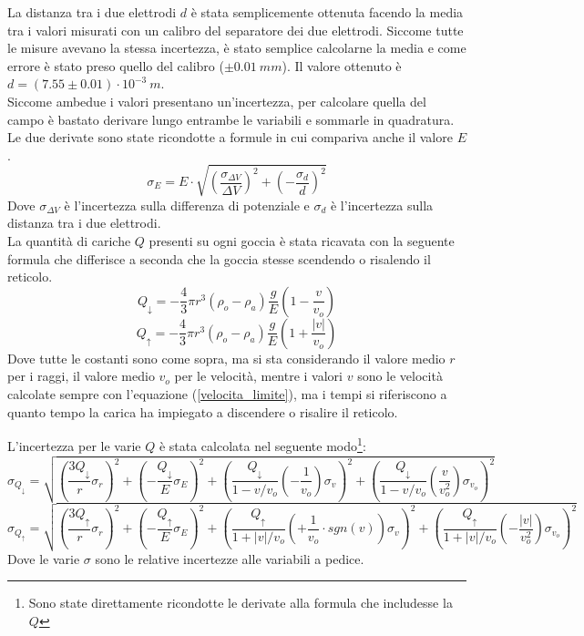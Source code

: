 \documentclass{article}
\begin{document}
La distanza tra i due elettrodi $d$ è stata semplicemente ottenuta facendo la media tra i valori misurati con un calibro del separatore dei due elettrodi. Siccome tutte le misure avevano la stessa incertezza, è stato semplice calcolarne la media e come errore è stato preso quello del calibro ($\pm 0.01\ mm$). Il valore ottenuto è $d = (7.55 \pm 0.01)\cdot10^{-3}\ m$.\\

Siccome ambedue i valori presentano un'incertezza, per calcolare quella del campo è bastato derivare lungo entrambe le variabili e sommarle in quadratura. Le due derivate sono state ricondotte a formule in cui compariva anche il valore $E$.
\begin{equation}
	\sigma_{E}=E\cdot\sqrt{\left(\frac{\sigma_{\Delta V}}{\Delta V}\right)^2+\left(-\frac{\sigma_d}{d}\right)^2}
\end{equation}
Dove $\sigma_{\Delta V}$ è l'incertezza sulla differenza di potenziale e $\sigma_d$ è l'incertezza sulla distanza tra i due elettrodi.\\

La quantità di cariche $Q$ presenti su ogni goccia è stata ricavata con la seguente formula che differisce a seconda che la goccia stesse scendendo o risalendo il reticolo.
\begin{equation}
	Q_{\downarrow}=-\frac{4}{3}\pi r^3(\rho_o-\rho_a)\frac{g}{E}\left(1-\frac{v}{v_o}\right)
	\label{qsu}
\end{equation}
\begin{equation}
	Q_{\uparrow}=-\frac{4}{3}\pi r^3(\rho_o-\rho_a)\frac{g}{E}\left(1+\frac{|v|}{v_o}\right)
	\label{qgiu}
\end{equation}
Dove tutte le costanti sono come sopra, ma si sta considerando il valore medio $r$ per i raggi, il valore medio $v_o$ per le velocità, mentre i valori $v$ sono le velocità calcolate sempre con l'equazione (\ref{velocita_limite}), ma i tempi si riferiscono a quanto tempo la carica ha impiegato a discendere o risalire il reticolo.

L'incertezza per le varie $Q$ è stata calcolata nel seguente modo\footnote{Sono state direttamente ricondotte le derivate alla formula che includesse la $Q$}:
\begin{equation}
	\sigma_{Q_{\downarrow}}=\sqrt{\left(\frac{3Q_{\downarrow}}{r}\sigma_r\right)^2+\left(-\frac{Q_{\downarrow}}{E}\sigma_E\right)^2+\left(\frac{Q_{\downarrow}}{1-v/v_o}\left(-\frac{1}{v_o}\right)\sigma_v\right)^2+\left(\frac{Q_{\downarrow}}{1-v/v_o}\left(\frac{v}{v_o^2}\right)\sigma_{v_o}\right)^2}
\end{equation}
\begin{equation}
	\sigma_{Q_{\uparrow}}=\sqrt{\left(\frac{3Q_{\uparrow}}{r}\sigma_r\right)^2+\left(-\frac{Q_{\uparrow}}{E}\sigma_E\right)^2+\left(\frac{Q_{\uparrow}}{1+|v|/v_o}\left(+\frac{1}{v_o}\cdot sgn(v)\right)\sigma_v\right)^2+\left(\frac{Q_{\uparrow}}{1+|v|/v_o}\left(-\frac{|v|}{v_o^2}\right)\sigma_{v_o}\right)^2}
\end{equation}
Dove le varie $\sigma$ sono le relative incertezze alle variabili a pedice.\\
\end{document}
